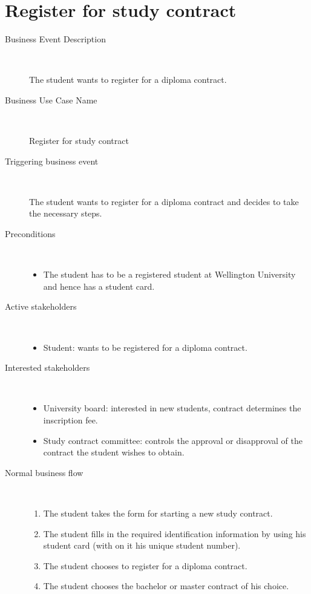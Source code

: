 \section{Register for study contract}

\begin{description}
	\item[Business Event Description] \ 
		\par The student wants to register for a diploma contract.
	\item[Business Use Case Name] \ 
		\par Register for study contract
	\item[Triggering business event] \ 
		\par The student wants to register for a diploma contract and decides to take the necessary steps.
	\item[Preconditions] \ 
	\begin{itemize}
		\item The student has to be a registered student at Wellington University and
		hence has a student card.
	\end{itemize}
	\item[Active stakeholders] \ 
	\begin{itemize}
		\item Student: wants to be registered for a diploma contract.
	\end{itemize}
	\item[Interested stakeholders] \ 
		\begin{itemize}
		\item University board: interested in new students, contract determines the
		inscription fee.
		\item Study contract committee: controls the approval or disapproval of the
		contract the student wishes to obtain.
		\end{itemize}
	\item[Normal business flow] \ 
	\begin{enumerate}
	  	\item The student takes the form for starting a new study contract.
	  	\item The student fills in the required identification information by using
	  	his student card (with on it his unique student number).
	  	\item The student chooses to register for a diploma contract.
	  	\item The student chooses the bachelor or master contract of his choice.

\end{enumerate}
\end{description}
